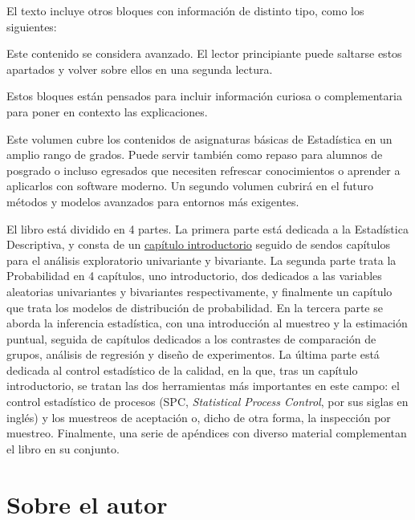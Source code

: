 \documentclass[
]{book}
\begin{document}
El texto incluye otros bloques con información de distinto tipo, como los siguientes:

\begin{rmdpremium}
Este contenido se considera avanzado. El lector principiante puede saltarse estos apartados
y volver sobre ellos en una segunda lectura.

\end{rmdpremium}

\begin{rmdcafe}
Estos bloques están pensados para incluir información curiosa o complementaria
para poner en contexto las explicaciones.

\end{rmdcafe}

Este volumen cubre los contenidos de asignaturas básicas de Estadística en un
amplio rango de grados. Puede servir también como repaso
para alumnos de posgrado o incluso egresados que necesiten refrescar
conocimientos o aprender a aplicarlos con software moderno. Un segundo volumen cubrirá en el futuro métodos y modelos avanzados para
entornos más exigentes.

El libro está dividido en 4 partes. La primera parte está dedicada a la Estadística
Descriptiva, y consta de un \protect\hyperlink{intro}{capítulo introductorio} seguido de sendos capítulos
para el análisis exploratorio univariante y bivariante. La segunda parte
trata la Probabilidad en 4 capítulos, uno introductorio, dos dedicados a las
variables
aleatorias univariantes y bivariantes respectivamente, y finalmente un capítulo
que trata los modelos de distribución de probabilidad. En la tercera parte se
aborda la inferencia estadística, con una introducción al muestreo y la
estimación puntual, seguida de capítulos dedicados a los contrastes de
comparación de grupos, análisis de regresión y diseño de experimentos. La última
parte está dedicada al control estadístico de la calidad, en la que,
tras un capítulo introductorio, se tratan las dos herramientas más importantes
en este campo: el control estadístico de procesos (SPC, \emph{Statistical Process
Control}, por sus siglas en inglés) y los muestreos de aceptación o, dicho de
otra forma, la inspección por muestreo. Finalmente, una serie de apéndices
con diverso material complementan el libro en su conjunto.

\hypertarget{sobre-el-autor}{%
\section*{Sobre el autor}\label{sobre-el-autor}}
\end{document}
